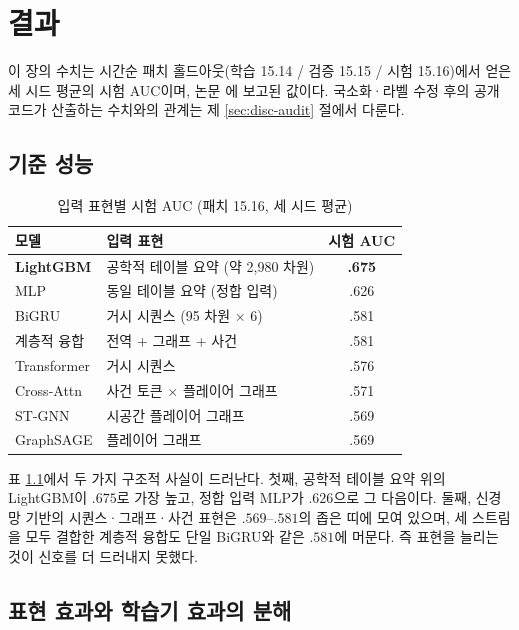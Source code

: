 \chapter{결과}
\label{ch:results}

이 장의 수치는 시간순 패치 홀드아웃(학습 15.14 / 검증 15.15 / 시험 15.16)에서 얻은 세 시드 평균의 시험 AUC이며, 논문 \cite{baek2026killconditioned}에 보고된 값이다. 국소화·라벨 수정 후의 공개 코드가 산출하는 수치와의 관계는 제 \ref{sec:disc-audit} 절에서 다룬다. 

\section{기준 성능}
\label{sec:results-baseline}

\begin{table}[htbp]
  \centering
  \caption{입력 표현별 시험 AUC (패치 15.16, 세 시드 평균)}
  \label{tab:baseline}
  \small
  \begin{tabular}{@{}llc@{}}
    \toprule
    모델 & 입력 표현 & 시험 AUC \\
    \midrule
    \textbf{LightGBM} & 공학적 테이블 요약 (약 2{,}980 차원) & \textbf{.675} \\
    MLP & 동일 테이블 요약 (정합 입력) & .626 \\
    BiGRU & 거시 시퀀스 (95 차원 $\times$ 6) & .581 \\
    계층적 융합 & 전역 + 그래프 + 사건 & .581 \\
    Transformer & 거시 시퀀스 & .576 \\
    Cross-Attn & 사건 토큰 $\times$ 플레이어 그래프 & .571 \\
    ST-GNN & 시공간 플레이어 그래프 & .569 \\
    GraphSAGE & 플레이어 그래프 & .569 \\
    \bottomrule
  \end{tabular}
\end{table}

표 \ref{tab:baseline}에서 두 가지 구조적 사실이 드러난다. 첫째, 공학적 테이블 요약 위의 LightGBM이 $.675$로 가장 높고, 정합 입력 MLP가 $.626$으로 그 다음이다. 둘째, 신경망 기반의 시퀀스·그래프·사건 표현은 $.569$--$.581$의 좁은 띠에 모여 있으며, 세 스트림을 모두 결합한 계층적 융합도 단일 BiGRU와 같은 $.581$에 머문다. 즉 표현을 늘리는 것이 신호를 더 드러내지 못했다.

\section{표현 효과와 학습기 효과의 분해}
\label{sec:results-decomp}

